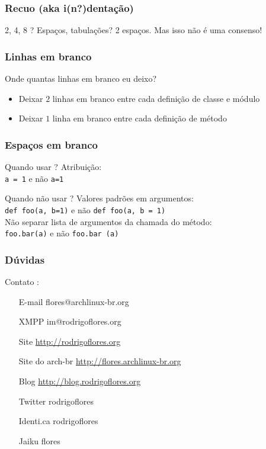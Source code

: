 \documentclass{beamer}
\begin{document}
\begin{frame}
    \frametitle{Recuo (aka i(n?)dentação)}
    \begin{block}{2, 4, 8 ? Espaços, tabulações?}
        2 espaços. Mas isso não é uma consenso!
    \end{block}
\end{frame}



\begin{frame}
    \frametitle{Linhas em branco}
    \begin{block}{Onde quantas linhas em branco eu deixo?}
        \begin{itemize}   
            \item Deixar $2$ linhas em branco entre cada definição de classe e módulo
            \item Deixar $1$ linha em branco entre cada definição de método
        \end{itemize}
    \end{block}
\end{frame}



\begin{frame}[fragile]
    \frametitle{Espaços em branco}
    \begin{block}{Quando usar ?}
        Atribuição:\\
        \verb#a = 1# e não \verb#a=1#
    \end{block}
    \begin{block}{Quando não usar ?}
        Valores padrões em argumentos:\\
        \verb#def foo(a, b=1)# e não \verb#def foo(a, b = 1)#\\
        Não separar lista de argumentos da chamada do método:\\
        \verb#foo.bar(a)# e não \verb#foo.bar (a)#
    \end{block}
\end{frame}



\begin{frame}
    \frametitle{Dúvidas}
    \begin{block}{Contato :}
        \begin{itemize}
            \centering
            \item[E-mail] flores@archlinux-br.org        
            \item[XMPP]  im@rodrigoflores.org        
            \item[Site]  \url{http://rodrigoflores.org}
            \item[Site do arch-br]  \url{http://flores.archlinux-br.org}
            \item[Blog]  \url{http://blog.rodrigoflores.org}        
            \item[Twitter] rodrigoflores        
            \item[Identi.ca] rodrigoflores        
            \item[Jaiku] flores        
        \end{itemize}
    \end{block}

\end{frame}
\end{document}
